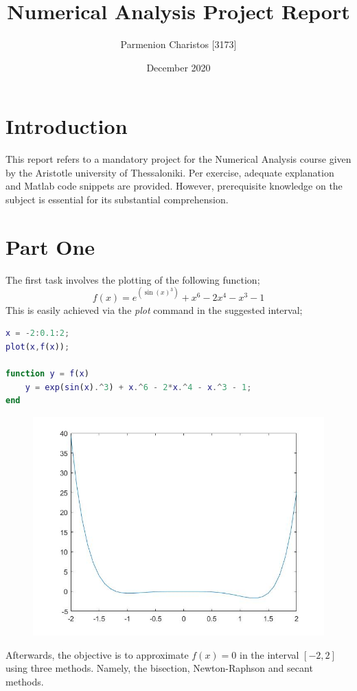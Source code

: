 \documentclass{article}
\title{Numerical Analysis Project Report}
\author{Parmenion Charistos [3173]}
\date{December 2020}
\begin{document}
\maketitle

\section*{Introduction}
This report refers to a mandatory project for the Numerical Analysis course given by the Aristotle university of Thessaloniki. Per exercise, adequate explanation and Matlab code snippets are provided. However, prerequisite knowledge on the subject is essential for its substantial comprehension.
\section{Part One}
The first task involves the plotting of the following function;
\[f(x) = e^(\sin(x)^3) + x^6 - 2x^4 - x^3 - 1\]
This is easily achieved via the \emph{plot} command in the suggested interval;
\begin{lstlisting}[language=Matlab]
x = -2:0.1:2;      
plot(x,f(x));       

function y = f(x)
    y = exp(sin(x).^3) + x.^6 - 2*x.^4 - x.^3 - 1;
end
\end{lstlisting}
\begin{figure}[h]
\includegraphics[scale=0.4]{images/f_plot.jpg}
\centering
\end{figure}
Afterwards, the objective is to approximate $f(x) = 0$ in the interval $[-2,2]$ using three methods. Namely, the bisection, Newton-Raphson and secant methods.
\pagebreak
\end{document}
